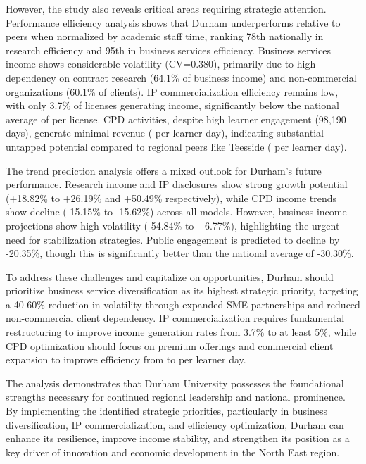 \documentclass[journal,onecolumn, 10pt,draftclsnofoot]{IEEEtran}
\begin{document}
However, the study also reveals critical areas requiring strategic attention. Performance efficiency analysis shows that Durham underperforms relative to peers when normalized by academic staff time, ranking 78th nationally in research efficiency and 95th in business services efficiency. Business services income shows considerable volatility (CV=0.380), primarily due to high dependency on contract research (64.1\% of business income) and non-commercial organizations (60.1\% of clients). IP commercialization efficiency remains low, with only 3.7\% of licenses generating income, significantly below the national average of  per license. CPD activities, despite high learner engagement (98,190 days), generate minimal revenue ( per learner day), indicating substantial untapped potential compared to regional peers like Teesside ( per learner day).

The trend prediction analysis offers a mixed outlook for Durham's future performance. Research income and IP disclosures show strong growth potential (+18.82\% to +26.19\% and +50.49\% respectively), while CPD income trends show decline (-15.15\% to -15.62\%) across all models. However, business income projections show high volatility (-54.84\% to +6.77\%), highlighting the urgent need for stabilization strategies. Public engagement is predicted to decline by -20.35\%, though this is significantly better than the national average of -30.30\%.

To address these challenges and capitalize on opportunities, Durham should prioritize business service diversification as its highest strategic priority, targeting a 40-60\% reduction in volatility through expanded SME partnerships and reduced non-commercial client dependency. IP commercialization requires fundamental restructuring to improve income generation rates from 3.7\% to at least 5\%, while CPD optimization should focus on premium offerings and commercial client expansion to improve efficiency from  to  per learner day.

The analysis demonstrates that Durham University possesses the foundational strengths necessary for continued regional leadership and national prominence. By implementing the identified strategic priorities, particularly in business diversification, IP commercialization, and efficiency optimization, Durham can enhance its resilience, improve income stability, and strengthen its position as a key driver of innovation and economic development in the North East region.
\end{document}
